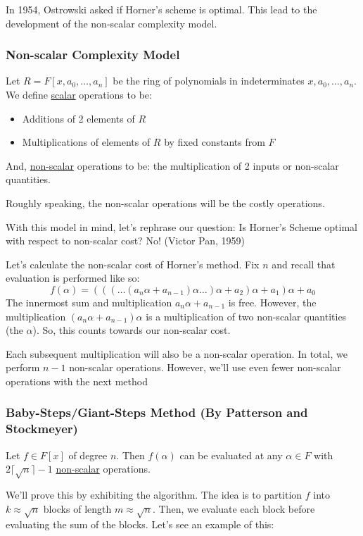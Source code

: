 In 1954, Ostrowski asked if Horner's scheme is optimal.
This lead to the development of the non-scalar complexity model.

\subsubsection{Non-scalar Complexity Model}
Let $R = F[x, a_0, \ldots, a_n]$ be the ring of polynomials in indeterminates $x, a_0, \ldots, a_n$.
We define \underline{scalar} operations to be:
\begin{itemize}
    \item Additions of 2 elements of $R$
    \item Multiplications of elements of $R$ by fixed constants from $F$
\end{itemize}
And, \underline{non-scalar} operations to be: the multiplication of 2 inputs or non-scalar quantities.

Roughly speaking, the non-scalar operations will be the costly operations.

With this model in mind, let's rephrase our question: Is Horner's Scheme optimal with respect to non-scalar cost?
No! (Victor Pan, 1959)

Let's calculate the non-scalar cost of Horner's method.
Fix $n$ and recall that evaluation is performed like so:
\begin{equation*}
    f(\alpha) = (((\ldots(a_n\alpha + a_{n-1})\alpha\ldots)\alpha + a_2)\alpha + a_1)\alpha + a_0
\end{equation*}
The innermost sum and multiplication $a_n\alpha + a_{n-1}$ is free.
However, the multiplication $(a_n\alpha + a_{n-1})\alpha$ is a multiplication of two non-scalar quantities (the $\alpha$).
So, this counts towards our non-scalar cost.

Each subsequent multiplication will also be a non-scalar operation.
In total, we perform $n-1$ non-scalar operations.
However, we'll use even fewer non-scalar operations with the next method

\subsubsection{Baby-Steps/Giant-Steps Method (By Patterson and Stockmeyer)}
\begin{theorem}
    Let $f \in F[x]$ of degree $n$. Then $f(\alpha)$ can be evaluated at any $\alpha \in F$ with $2\lceil \sqrt{n} \rceil - 1$ \underline{non-scalar} operations.
\end{theorem}
We'll prove this by exhibiting the algorithm.
The idea is to partition $f$ into $k \approx \sqrt{n}$ blocks of length $m \approx \sqrt{n}$.
Then, we evaluate each block before evaluating the sum of the blocks.
Let's see an example of this:

